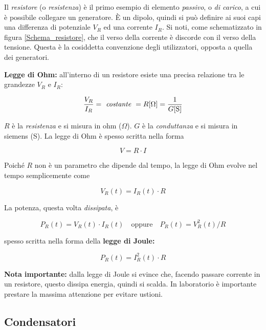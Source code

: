 \documentclass{article}
\begin{document}
Il \textit{resistore} (o \textit{resistenza}) è il primo esempio di elemento \textit{passivo}, o \textit{di carico}, a cui è possibile collegare un generatore. È un dipolo, quindi si può definire ai suoi capi una differenza di potenziale $V_R$ ed una corrente $I_R$. Si noti, come schematizzato in figura \ref{Schema_resistore}, che il verso della corrente è discorde con il verso della tensione. Questa è la cosiddetta convenzione degli utilizzatori, opposta a quella dei generatori.

\vspace{3mm}

\textbf{Legge di Ohm:} all'interno di un resistore esiste una precisa relazione tra le grandezze $V_R$ e $I_R$:

\[\frac{V_R}{I_R} = \textit{ costante } = R [\Omega] = \frac{1}{G [\textrm S]}\]

$R$ è la \textit{resistenza} e si misura in ohm ($\Omega$). $G$ è la \textit{conduttanza} e si misura in siemens (S). La legge di Ohm è spesso scritta nella forma

\begin{equation}
V = R \cdot I
\label{Ohm}
\end{equation}

Poiché $R$ non è un parametro che dipende dal tempo, la legge di Ohm evolve nel tempo semplicemente come

\[V_R (t) = I_R (t) \cdot R\]

La potenza, questa volta \textit{dissipata}, è 

\[P_R (t) = V_R (t) \cdot I_R (t) \quad \textrm{oppure} \quad P_R (t) = V_R^2 (t) / R\]

spesso scritta nella forma della \textbf{legge di Joule:}

\begin{equation}
P_R (t) = I_R^2 (t) \cdot R
\label{Joule}
\end{equation}

\textbf{Nota importante:} dalla legge di Joule si evince che, facendo passare corrente in un resistore, questo dissipa energia, quindi si scalda. In laboratorio è importante prestare la massima attenzione per evitare ustioni.

\newpage








\subsection{Condensatori}
\end{document}
